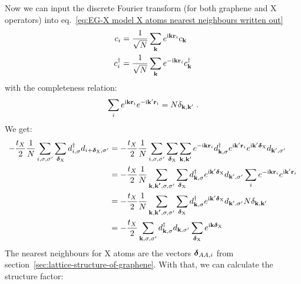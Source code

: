 Now we can input the discrete Fourier transform (for both graphene and X operators) into eq.~\ref{eq:EG-X model X atoms nearest neighbours written out}
\begin{align}
    c_{i} &= \frac{1}{\sqrt{N}} \sum_{\bm{\mathrm{k}}} e^{\mathrm{i} \bm{\mathrm{k}} \bm{\mathrm{r}}_{i}} c_{\bm{\mathrm{k}}} \\
    c_{i}^{\dagger} &= \frac{1}{\sqrt{N}} \sum_{\bm{\mathrm{k}}} e^{-\mathrm{i} \bm{\mathrm{k}} \bm{\mathrm{r}}_{i}} c_{\bm{\mathrm{k}}}^{\dagger}
\end{align}
with the completeness relation:
\begin{equation}
    \sum_{i} e^{\mathrm{i} \bm{\mathrm{k}} \bm{\mathrm{r}}_{i}} e^{-\mathrm{i} \bm{\mathrm{k}}^{\prime} \bm{\mathrm{r}}_{i}} = N \delta_{\bm{\mathrm{k}}, \bm{\mathrm{k}}^{\prime}}
    \;.
\end{equation}
We get:
\begin{align}
    -\frac{t_X}{2} \frac{1}{N} \sum_{i,\sigma, \sigma^{\prime}} \sum_{\bm{\mathrm{\delta}}_{\mathrm{X}}} d_{i, \sigma}^{\dagger} d_{i + \bm{\mathrm{\delta}}_{\mathrm{X}}, \sigma^{\prime}}
    &= -\frac{t_X}{2} \frac{1}{N} \sum_{i,\sigma, \sigma^{\prime}} \sum_{\bm{\mathrm{\delta}}_{\mathrm{X}}} \sum_{\bm{\mathrm{k}}, \bm{\mathrm{k}}^{\prime}} e^{-\mathrm{i} \bm{\mathrm{k}} \bm{\mathrm{r}}_i} d_{\bm{\mathrm{k}}, \sigma}^{\dagger} e^{\mathrm{i} \bm{\mathrm{k}}^{\prime} \bm{\mathrm{r}}_i} e^{\mathrm{i} \bm{\mathrm{k}}^{\prime} \bm{\mathrm{\delta}}_{\mathrm{X}}} d_{\bm{\mathrm{k}}^{\prime}, \sigma^{\prime}} \\
    &= -\frac{t_X}{2} \frac{1}{N} \sum_{\bm{\mathrm{k}}, \bm{\mathrm{k^{\prime}}}, \sigma, \sigma^{\prime}} \sum_{\bm{\mathrm{\delta}}_{\mathrm{X}}} d_{\bm{\mathrm{k}}, \sigma}^{\dagger}  e^{\mathrm{i} \bm{\mathrm{k}}^{\prime} \bm{\mathrm{\delta}}_{\mathrm{X}}} d_{\bm{\mathrm{k}}^{\prime}, \sigma^{\prime}} \sum_{i} e^{-\mathrm{i} \bm{\mathrm{k}} \bm{\mathrm{r}}_i} e^{\mathrm{i} \bm{\mathrm{k}}^{\prime} \bm{\mathrm{r}}_i} \\
    &= -\frac{t_X}{2} \frac{1}{N} \sum_{\bm{\mathrm{k}}, \bm{\mathrm{k^{\prime}}}, \sigma, \sigma^{\prime}} \sum_{\bm{\mathrm{\delta}}_{\mathrm{X}}} d_{\bm{\mathrm{k}}, \sigma}^{\dagger}  e^{\mathrm{i} \bm{\mathrm{k}}^{\prime} \bm{\mathrm{\delta}}_{\mathrm{X}}} d_{\bm{\mathrm{k}}^{\prime}, \sigma^{\prime}} N \delta_{\bm{\mathrm{k}}, \bm{\mathrm{k}}^{\prime}} \\
    &= -\frac{t_X}{2} \sum_{\bm{\mathrm{k}}, \sigma, \sigma^{\prime}}  d_{\bm{\mathrm{k}}, \sigma}^{\dagger}d_{\bm{\mathrm{k}}, \sigma^{\prime}} \sum_{\bm{\mathrm{\delta}}_{\mathrm{X}}} e^{\mathrm{i} \bm{\mathrm{k}} \bm{\mathrm{\delta}}_{\mathrm{X}}}
\end{align}
The nearest neighbours for \(\mathrm{X}\) atoms are the vectors \(\bm{\mathrm{\delta}}_{AA, i}\) from section~\ref{sec:lattice-structure-of-graphene}.
With that, we can calculate the structure factor:
